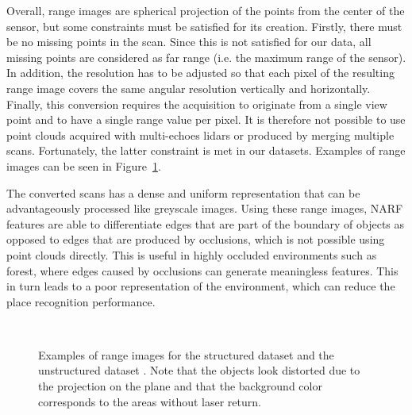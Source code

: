 Overall, range images are spherical projection of the points from the center of the sensor, but some constraints must be satisfied for its creation. Firstly, there must be no missing points in the scan. Since this is not satisfied for our data, all missing points are considered as far range (i.e. the maximum range of the sensor). In addition, the resolution has to be adjusted so that each pixel of the resulting range image covers the same angular resolution vertically and horizontally. Finally, this conversion requires the acquisition to originate from a single view point and to have a single range value per pixel. It is therefore not possible to use point clouds acquired with multi-echoes \gls*{lidar}s or produced by merging multiple scans. Fortunately, the latter constraint is met in our datasets. Examples of range images can be seen in Figure~\ref{fig:chap_slam_range}.

The converted scans has a dense and uniform representation that can be advantageously processed like greyscale images. Using these range images, NARF features are able to differentiate edges that are part of the boundary of objects as opposed to edges that are produced by occlusions, which is not possible using point clouds directly. This is useful in highly occluded environments such as forest, where edges caused by occlusions can generate meaningless features. This in turn leads to a poor representation of the environment, which can reduce the place recognition performance.


\begin{figure}[H]
    \centering
    \\
    \caption{Examples of range images for the structured dataset \protect{} and the unstructured dataset \protect{}. Note that the objects look distorted due to the projection on the plane and that the background color corresponds to the areas without laser return.}
    \label{fig:chap_slam_range}
\end{figure}

